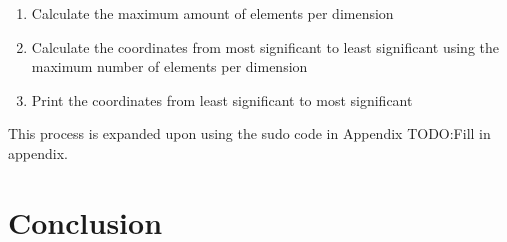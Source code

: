 \documentclass[10pt,twocolumn]{witseiepaper}
\begin{document}
\begin{enumerate}
	\item Calculate the maximum amount of elements per dimension
	\item Calculate the coordinates from most significant to least significant using the maximum number of elements per dimension
	\item Print the coordinates from least significant to most significant
\end{enumerate}

This process is expanded upon using the sudo code in Appendix TODO:Fill in appendix.

\section{Conclusion}



\end{document}
